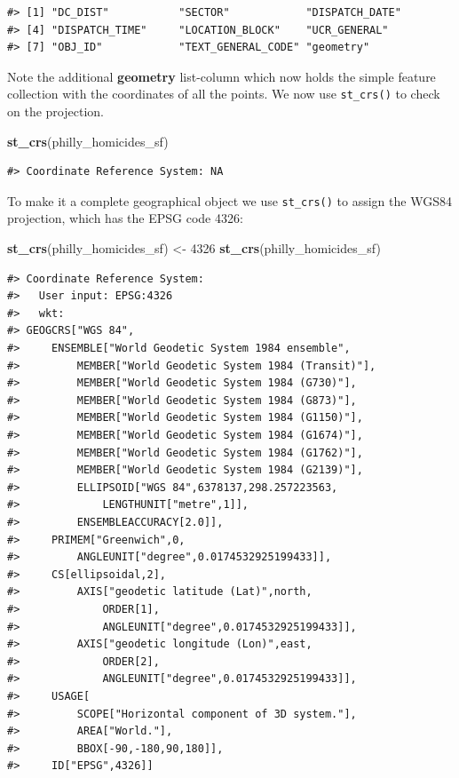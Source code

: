 \documentclass[
]{book}
\newenvironment{Shaded}{\begin{snugshade}}{\end{snugshade}}
\newcommand{\DecValTok}[1]{\textcolor[rgb]{0.00,0.00,0.81}{#1}}
\newcommand{\FunctionTok}[1]{\textcolor[rgb]{0.13,0.29,0.53}{\textbf{#1}}}
\newcommand{\NormalTok}[1]{#1}
\newcommand{\OtherTok}[1]{\textcolor[rgb]{0.56,0.35,0.01}{#1}}
\begin{document}
\begin{verbatim}
#> [1] "DC_DIST"           "SECTOR"            "DISPATCH_DATE"    
#> [4] "DISPATCH_TIME"     "LOCATION_BLOCK"    "UCR_GENERAL"      
#> [7] "OBJ_ID"            "TEXT_GENERAL_CODE" "geometry"
\end{verbatim}

Note the additional \textbf{geometry} list-column which now holds the simple feature collection with the coordinates of all the points. We now use \texttt{st\_crs()} to check on the projection.

\begin{Shaded}
\begin{Highlighting}[]
\FunctionTok{st\_crs}\NormalTok{(philly\_homicides\_sf)}
\end{Highlighting}
\end{Shaded}

\begin{verbatim}
#> Coordinate Reference System: NA
\end{verbatim}

To make it a complete geographical object we use \texttt{st\_crs()} to assign the WGS84 projection, which has the EPSG code 4326:

\begin{Shaded}
\begin{Highlighting}[]
\FunctionTok{st\_crs}\NormalTok{(philly\_homicides\_sf) }\OtherTok{\textless{}{-}} \DecValTok{4326}
\FunctionTok{st\_crs}\NormalTok{(philly\_homicides\_sf)}
\end{Highlighting}
\end{Shaded}

\begin{verbatim}
#> Coordinate Reference System:
#>   User input: EPSG:4326 
#>   wkt:
#> GEOGCRS["WGS 84",
#>     ENSEMBLE["World Geodetic System 1984 ensemble",
#>         MEMBER["World Geodetic System 1984 (Transit)"],
#>         MEMBER["World Geodetic System 1984 (G730)"],
#>         MEMBER["World Geodetic System 1984 (G873)"],
#>         MEMBER["World Geodetic System 1984 (G1150)"],
#>         MEMBER["World Geodetic System 1984 (G1674)"],
#>         MEMBER["World Geodetic System 1984 (G1762)"],
#>         MEMBER["World Geodetic System 1984 (G2139)"],
#>         ELLIPSOID["WGS 84",6378137,298.257223563,
#>             LENGTHUNIT["metre",1]],
#>         ENSEMBLEACCURACY[2.0]],
#>     PRIMEM["Greenwich",0,
#>         ANGLEUNIT["degree",0.0174532925199433]],
#>     CS[ellipsoidal,2],
#>         AXIS["geodetic latitude (Lat)",north,
#>             ORDER[1],
#>             ANGLEUNIT["degree",0.0174532925199433]],
#>         AXIS["geodetic longitude (Lon)",east,
#>             ORDER[2],
#>             ANGLEUNIT["degree",0.0174532925199433]],
#>     USAGE[
#>         SCOPE["Horizontal component of 3D system."],
#>         AREA["World."],
#>         BBOX[-90,-180,90,180]],
#>     ID["EPSG",4326]]
\end{verbatim}
\end{document}
